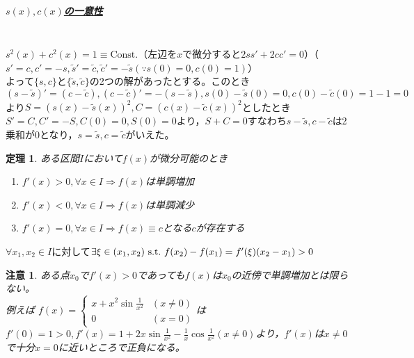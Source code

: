\documentclass[dvipdfmx,a4j,10pt]{jsarticle}
\makeatletter
\theoremstyle{mystyle1}
\newtheorem{thm}[dfn]{定理}
\theoremstyle{mystyle2}
\newtheorem{note}{注意}
\renewenvironment{proof}[1][\proofname]{\par
  \pushQED{\qed}%
  \normalfont
  \topsep6\p@\@plus6\p@ \trivlist
  \item[\hskip\labelsep{\bfseries\sffamily #1}]\ignorespaces
}{%
  \popQED\endtrivlist\@endpefalse
}
\renewcommand\proofname{証明}
\makeatother
\begin{document}
\subparagraph{\underline{$s(x),c(x)$の一意性}}
　\\
$s^2(x)+c^2(x)=1\equiv \textrm{Const.}$（左辺を$x$で微分すると$2ss'+2cc'=0$）（$s'=c,c'=-s,\tilde{s}'=\tilde{c},\tilde{c}'=-\tilde{s}(\because s(0)=0,c(0)=1)$）\\
よって$\{s,c\}$と$\{\tilde{s},\tilde{c}\}$の2つの解があったとする。このとき$(s-\tilde{s})'=(c-\tilde{c}),(c-\tilde{c})'=-(s-\tilde{s}),s(0)-\tilde{s}(0)=0,c(0)-\tilde{c}(0)=1-1=0$より$S=(s(x)-\tilde{s}(x))^2,C=(c(x)-\tilde{c}(x))^2$としたとき$S'=C,C'=-S,C(0)=0,S(0)=0$より，$S+C=0$すなわち$s-\tilde{s},c-\tilde{c}$は2乗和が0となり，$s=\tilde{s},c=\tilde{c}$がいえた。

\begin{framed}
    \begin{thm}\label{thm7.4}
        ある区間$I$において$f(x)$が微分可能のとき
        \begin{enumerate}
            \item $f'(x)>0,\forall x\in I \Rightarrow f(x)$は単調増加
            \item $f'(x)<0,\forall x\in I \Rightarrow f(x)$は単調減少
            \item $f'(x)=0,\forall x\in I \Rightarrow f(x)\equiv c$となる$c$が存在する
        \end{enumerate}
    \end{thm}
\end{framed}

\begin{proof}[定理\ref{thm7.4}の証明]
    $\forall x_1,x_2\in I$に対して$\exists\xi\in (x_1,x_2)\ {\rm s.t.}\ f(x_2)-f(x_1)=f'(\xi)(x_2-x_1)>0$
\end{proof}

\begin{note}
    ある点$x_0$で$f'(x)>0$であっても$f(x)$は$x_0$の近傍で単調増加とは限らない。\\
    例えば
    $ f(x) =
    \begin{cases}
    \displaystyle x+x^2\sin{\frac{1}{x^2}} & (x \neq0)\\
    0 & (x = 0)
    \end{cases}
    $は$\displaystyle f'(0)=1>0,f'(x)=1+2x\sin{\frac{1}{x^2}}-\frac{1}{x}\cos{\frac{1}{x^2}}(x\neq0)$より，$f'(x)$は$x\neq0$で十分$x=0$に近いところで正負になる。
\end{note}

\newpage
\end{document}
